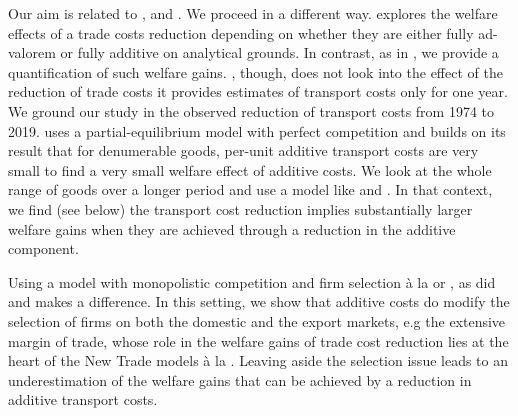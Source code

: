 \documentclass[a4paper,11pt]{article}
\newcommand\cites[1]{\citeauthor{#1}'s\ (\citeyear{#1})}
\begin{document}
Our aim is related to \cite{Irrazabal_2015}, \cite{sorensen2014} and \cite{Lashkaripour_JIE2020}. We proceed in a different way. \cite{sorensen2014} explores the welfare effects of a trade costs reduction depending on whether they are either fully ad-valorem or fully additive on analytical grounds. In contrast, as in \cite{Irrazabal_2015}, we provide a quantification of such welfare gains. \cite{Irrazabal_2015}, though, does not look into the effect of the reduction of trade costs it provides estimates of transport costs only for one year. We ground our study in the observed reduction of transport costs from 1974 to 2019.  \cite{Lashkaripour_JIE2020} uses a partial-equilibrium model with perfect competition and builds on its result that for  denumerable goods, per-unit additive transport costs are very small to find a very small welfare effect of additive costs. We look at the whole range of goods over a longer period and use a \citet{melitz} model like \cite{sorensen2014} and \cite{Irrazabal_2015}. In that context,
we find (see below) the transport cost reduction implies substantially larger welfare gains when they are achieved through a reduction in the additive component.

Using a model with monopolistic competition and firm selection \`{a} la \cite{melitz} or \cite{chaney2008}, as did \cite{sorensen2014} and \cite{Irrazabal_2015} makes a difference. In this setting, we show that additive costs do modify the selection of firms on both the domestic and the export markets, e.g the extensive margin of trade, whose role in the welfare gains of trade cost reduction lies at the heart of the New Trade models  \`{a} la \cite{melitz}. Leaving aside the selection issue leads to an underestimation of the welfare gains that can be achieved by a reduction in additive transport costs.
\end{document}

